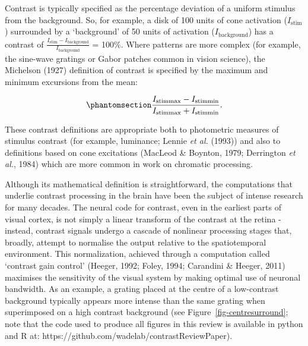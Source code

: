 \documentclass[
  letterpaper,
  DIV=11,
  numbers=noendperiod]{scrartcl}
\begin{document}
Contrast is typically specified as the percentage deviation of a uniform
stimulus from the background. So, for example, a disk of 100 units of
cone activation (\(I_{\mathrm{stim}}\)) surrounded by a `background' of
50 units of activation (\(I_{\mathrm{background}}\)) has a contrast of
\(\frac{I_{\mathrm{stim}} - I_{\mathrm{background}}}{I_{\mathrm{background}}}\)
= 100\%. Where patterns are more complex (for example, the sine-wave
gratings or Gabor patches common in vision science), the Michelson
(1927) definition of contrast is specified by the maximum and minimum
excursions from the mean:

\begin{equation}\phantomsection\label{eq-michelson}{\frac {I_{\mathrm{stimmax} }-I_{\mathrm{stimmin} }}{I_{\mathrm{stimmax} }+I_{\mathrm{stimmin} }}.}\end{equation}

These contrast definitions are appropriate both to photometric measures
of stimulus contrast (for example, luminance; Lennie \emph{et al.}
(1993)) and also to definitions based on cone excitations (MacLeod \&
Boynton, 1979; Derrington \emph{et al.}, 1984) which are more common in
work on chromatic processing.

Although its mathematical definition is straightforward, the
computations that underlie contrast processing in the brain have been
the subject of intense research for many decades. The neural code for
contrast, even in the earliest parts of visual cortex, is not simply a
linear transform of the contrast at the retina - instead, contrast
signals undergo a cascade of nonlinear processing stages that, broadly,
attempt to normalise the output relative to the spatiotemporal
environment. This normalization, achieved through a computation called
`contrast gain control' (Heeger, 1992; Foley, 1994; Carandini \& Heeger,
2011) maximises the sensitivity of the visual system by making optimal
use of neuronal bandwidth. As an example, a grating placed at the centre
of a low-contrast background typically appears more intense than the
same grating when superimposed on a high contrast background (see
Figure~\ref{fig-centresurround}; note that the code used to produce all
figures in this review is available in python and R at:
https://github.com/wadelab/contrastReviewPaper).
\end{document}
